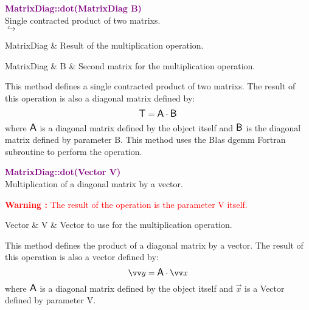 \textcolor{purple}{\textbf{MatrixDiag::dot(MatrixDiag B)}}\label{MatrixDiag::dot(MatrixDiag B)}\\
Single contracted product of two matrixs.\\ \hspace*{5mm}$\hookrightarrow$
\vspace*{-2em}\begin{tcolorbox}[grow to left by=-1cm, width=\textwidth-1cm,myArgs,tabularx={l|R}]
MatrixDiag & Result of the multiplication operation.
\end{tcolorbox}

\begin{tcolorbox}[width=\textwidth,myArgs,tabularx={ll|R}]
MatrixDiag & B & Second matrix for the multiplication operation.
\end{tcolorbox}

This method defines a single contracted product of two matrixs.
The result of this operation is also a diagonal matrix defined by:
\begin{equation*}
\mbox{\large\ensuremath{\mathsf{T}}} = \mbox{\large\ensuremath{\mathsf{A}}} \cdot \mbox{\large\ensuremath{\mathsf{B}}}
\end{equation*}
where $\mbox{\large\ensuremath{\mathsf{A}}}$ is a diagonal matrix defined by the object itself and $\mbox{\large\ensuremath{\mathsf{B}}}$ is the diagonal matrix defined by parameter B.
This method uses the Blas \textsf{dgemm} Fortran subroutine to perform the operation.

\textcolor{purple}{\textbf{MatrixDiag::dot(Vector V)}}\label{MatrixDiag::dot(Vector V)}\\
Multiplication of a diagonal matrix by a vector.

\hspace*{10mm}\textcolor{red}{\textbf{Warning :}  The result of the operation is the parameter V itself.}

\begin{tcolorbox}[width=\textwidth,myArgs,tabularx={ll|R}]
Vector & V & Vector to use for the multiplication operation.
\end{tcolorbox}

This method defines the product of a diagonal matrix by a vector.
The result of this operation is also a vector defined by:
\begin{equation*}
\overrightarrow{y} = \A \cdot \overrightarrow{x}
\end{equation*}
where $\mbox{\large\ensuremath{\mathsf{A}}}$ is a diagonal matrix defined by the object itself and $\overrightarrow{x}$ is a Vector defined by parameter V.

